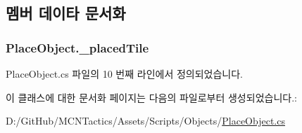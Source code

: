 \subsection{멤버 데이타 문서화}
\subsubsection[{\texorpdfstring{\+\_\+placed\+Tile}{_placedTile}}]{ Place\+Object.\+\_\+placed\+Tile\hspace{0.3cm}{\ttfamily [protected]}}\hypertarget{class_place_object_a2006d9f7ffcf8aba6f731ebfc9b0af35}{}\label{class_place_object_a2006d9f7ffcf8aba6f731ebfc9b0af35}


Place\+Object.\+cs 파일의 10 번째 라인에서 정의되었습니다.



이 클래스에 대한 문서화 페이지는 다음의 파일로부터 생성되었습니다.\+:\begin{DoxyCompactItemize}
\item 
D\+:/\+Git\+Hub/\+M\+C\+N\+Tactics/\+Assets/\+Scripts/\+Objects/\hyperlink{_place_object_8cs}{Place\+Object.\+cs}\end{DoxyCompactItemize}
